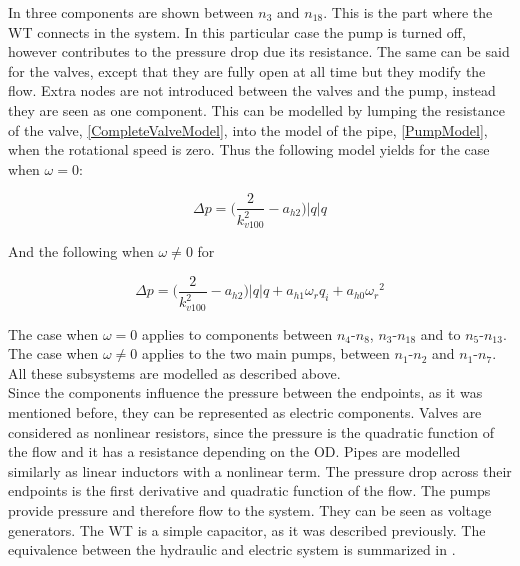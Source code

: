 In  three components are shown between $n_3$ and $n_{18}$. This is the part where the WT connects in the system. In this particular case the pump is turned off, however contributes to the pressure drop due its resistance. The same can be said for the valves, except that they are fully open at all time but they modify the flow. Extra nodes are not introduced between the valves and the pump, instead they are seen as one component. This can be modelled by lumping the resistance of the valve, \eqref{CompleteValveModel}, into the model of the pipe, \eqref{PumpModel}, when the rotational speed is zero. Thus the following model yields for the case when $\omega = 0$:

\begin{equation}
  \Delta p = \Big(\frac{2}{k_{v100}^2} - a_{h2}\Big)|q| q 
  \label{omega_zero}
\end{equation}

And the following when $\omega \neq 0$ for 

\begin{equation}
  \Delta p = \Big(\frac{2}{k_{v100}^2} - a_{h2}\Big)|q| q  + a_{h1} \omega_r q_i + a_{h0}{\omega_r}^2
  \label{omega_notzero}
\end{equation}

The case when $\omega = 0$ applies to components between $n_4$-$n_8$, $n_3$-$n_{18}$  and to $n_5$-$n_{13}$. The case when $\omega \neq 0$ applies to the two main pumps, between $n_1$-$n_2$ and $n_1$-$n_7$. All these subsystems are modelled as described above. 
\\
Since the components influence the pressure between the endpoints, as it was mentioned before, they can be represented as electric components. Valves are considered as nonlinear resistors, since the pressure is the quadratic function of the flow and it has a resistance depending on the OD. Pipes are modelled similarly as linear inductors with a nonlinear term. The pressure drop across their endpoints is the first derivative and quadratic function of the flow. The pumps provide pressure and therefore flow to the system. They can be seen as voltage generators. The WT is a simple capacitor, as it was described previously. The equivalence between the hydraulic and electric system is summarized in .

